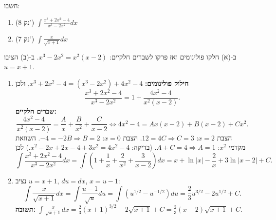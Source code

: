 
\begin{question}
חשבו:
\begin{enumerate}
  \item[(א)] (8 נק') $\displaystyle\int\frac{x^3+2x^2-4}{x^3-2x^2}dx$
  \item[(ב)] (7 נק') $\displaystyle\int\frac{x}{\sqrt{x+1}}dx$
\end{enumerate}
\end{question}

\begin{hint}
ב-(א) חלקו פולינומים ואז פרקו לשברים חלקיים: $x^3-2x^2=x^2(x-2)$. ב-(ב) הציבו $u=x+1$.
\end{hint}

\begin{solution}
\begin{enumerate}
  \item[(א)] \textbf{חילוק פולינומים:} $x^3+2x^2-4=(x^3-2x^2)+4x^2-4$, ולכן
  \[
  \frac{x^3+2x^2-4}{x^3-2x^2}=1+\frac{4x^2-4}{x^2(x-2)}.
  \]
  \textbf{שברים חלקיים:}
  \[
  \frac{4x^2-4}{x^2(x-2)}=\frac Ax+\frac B{x^2}+\frac C{x-2}\iff 4x^2-4=Ax(x-2)+B(x-2)+Cx^2.
  \]
  הצבת $x=2$: $12=4C\Rightarrow C=3$. הצבת $x=0$: $-4=-2B\Rightarrow B=2$. השוואת מקדמי $x^2$: $A+C=4\Rightarrow A=1$.
  (בדיקה: $x^2-2x+2x-4+3x^2=4x^2-4$.) לכן
  \[
  \int\frac{x^3+2x^2-4}{x^3-2x^2}dx=\int\left(1+\frac1x+\frac2{x^2}+\frac3{x-2}\right)dx=x+\ln|x|-\frac2x+3\ln|x-2|+C.
  \]

  \item[(ב)] נציב $u=x+1$, $du=dx$, $x=u-1$:
  \[
  \int\frac{x}{\sqrt{x+1}}dx=\int\frac{u-1}{\sqrt u}du=\int\left(u^{1/2}-u^{-1/2}\right)du=\frac23u^{3/2}-2u^{1/2}+C.
  \]
  \textbf{תשובה:} $\displaystyle\int\frac{x}{\sqrt{x+1}}dx=\frac23(x+1)^{3/2}-2\sqrt{x+1}+C=\frac23(x-2)\sqrt{x+1}+C$.
\end{enumerate}
\end{solution}
